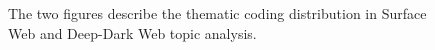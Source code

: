 \begin{figure}[h!]
	\hfill
	\caption{The two figures describe the thematic coding distribution in Surface Web and Deep-Dark Web topic analysis.}
	\label{fig:distribution}
\end{figure}














